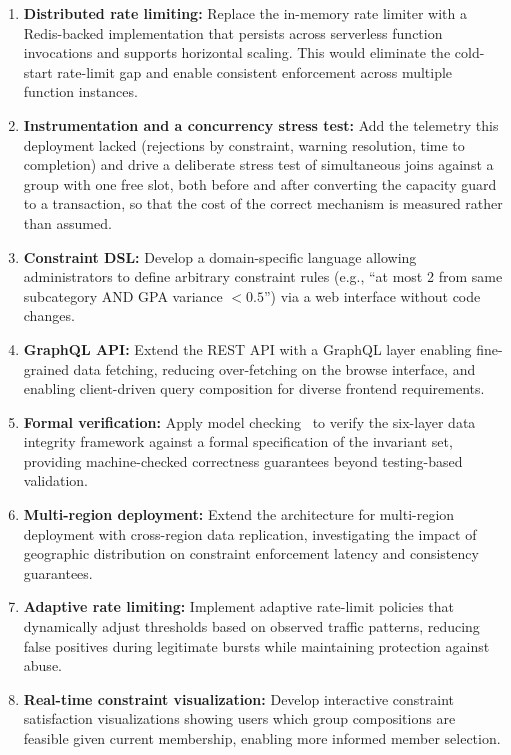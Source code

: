 \documentclass[11pt,a4paper]{article}
\theoremstyle{plain}
\theoremstyle{definition}
\theoremstyle{remark}
\begin{document}
\begin{enumerate}[noitemsep,topsep=4pt]
    \item \textbf{Distributed rate limiting:} Replace the in-memory rate limiter with a Redis-backed implementation that persists across serverless function invocations and supports horizontal scaling. This would eliminate the cold-start rate-limit gap and enable consistent enforcement across multiple function instances.

    \item \textbf{Instrumentation and a concurrency stress test:} Add the telemetry this deployment lacked (rejections by constraint, warning resolution, time to completion) and drive a deliberate stress test of simultaneous joins against a group with one free slot, both before and after converting the capacity guard to a transaction, so that the cost of the correct mechanism is measured rather than assumed.

    \item \textbf{Constraint DSL:} Develop a domain-specific language allowing administrators to define arbitrary constraint rules (e.g., ``at most 2 from same subcategory AND GPA variance $< 0.5$'') via a web interface without code changes.

    \item \textbf{GraphQL API:} Extend the REST API with a GraphQL layer enabling fine-grained data fetching, reducing over-fetching on the browse interface, and enabling client-driven query composition for diverse frontend requirements.

    \item \textbf{Formal verification:} Apply model checking~\cite{baier2008} to verify the six-layer data integrity framework against a formal specification of the invariant set, providing machine-checked correctness guarantees beyond testing-based validation.

    \item \textbf{Multi-region deployment:} Extend the architecture for multi-region deployment with cross-region data replication, investigating the impact of geographic distribution on constraint enforcement latency and consistency guarantees.

    \item \textbf{Adaptive rate limiting:} Implement adaptive rate-limit policies that dynamically adjust thresholds based on observed traffic patterns, reducing false positives during legitimate bursts while maintaining protection against abuse.

    \item \textbf{Real-time constraint visualization:} Develop interactive constraint satisfaction visualizations showing users which group compositions are feasible given current membership, enabling more informed member selection.
\end{enumerate}
\end{document}
